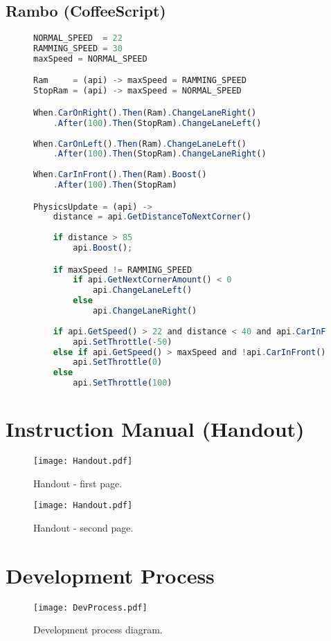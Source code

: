 \subsection{Rambo (CoffeeScript)}
\begin{figure}[H]
\begin{lstlisting}[language=JavaScript]
NORMAL_SPEED  = 22
RAMMING_SPEED = 30
maxSpeed = NORMAL_SPEED

Ram     = (api) -> maxSpeed = RAMMING_SPEED
StopRam = (api) -> maxSpeed = NORMAL_SPEED

When.CarOnRight().Then(Ram).ChangeLaneRight()
    .After(100).Then(StopRam).ChangeLaneLeft()
    
When.CarOnLeft().Then(Ram).ChangeLaneLeft()
    .After(100).Then(StopRam).ChangeLaneRight()
    
When.CarInFront().Then(Ram).Boost()
    .After(100).Then(StopRam)

PhysicsUpdate = (api) -> 
    distance = api.GetDistanceToNextCorner() 
    
    if distance > 85
        api.Boost(); 

    if maxSpeed != RAMMING_SPEED 
        if api.GetNextCornerAmount() < 0 
            api.ChangeLaneLeft() 
        else
            api.ChangeLaneRight()
    
    if api.GetSpeed() > 22 and distance < 40 and api.CarInFront() 
        api.SetThrottle(-50) 
    else if api.GetSpeed() > maxSpeed and !api.CarInFront() 
        api.SetThrottle(0) 
    else
        api.SetThrottle(100)
\end{lstlisting}
\end{figure}

\section{Instruction Manual (Handout)}

\begin{figure}[H]
\centering
\texttt{[image: Handout.pdf]}
\caption{Handout - first page.}
\end{figure}
\begin{figure}[H]
\centering
\texttt{[image: Handout.pdf]}
\caption{Handout - second page.}
\end{figure}

\section{Development Process}

\begin{figure}[H]
\centering
\texttt{[image: DevProcess.pdf]}
\caption{Development process diagram.}
\end{figure}